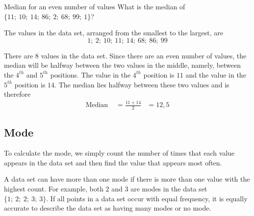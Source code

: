 \begin{wex}{Median for an even number of values}{
  What is the median of $\{11;\ 10;\ 14;\ 86;\ 2;\ 68;\ 99;\ 1\}$?
}{

  The values in the data set, arranged from the smallest to the largest, are
  \begin{equation*}
    1;\ 2;\ 10;\ 11;\ 14;\ 68;\ 86;\ 99
  \end{equation*}


  There are $8$ values in the data set. Since there are an even number
  of values, the median will be halfway between the two values in the
  middle, namely, between the $4^{th}$ and $5^{th}$ positions. The value in the
  $4^{th}$ position is $11$ and the value in the $5^{th}$ position is
  $14$. The median lies halfway between these two values and is
  therefore
  \begin{align*}
    \mbox{Median } &=\frac{11+14}{2} 
&= 12,5
  \end{align*}
}
\end{wex}

\subsection{Mode}

To calculate the mode, we simply count the number of times that each
value appears in the data set and then find the value that appears
most often.

A data set can have more than one mode if there is more than one value
with the highest count. For example, both $2$ and $3$ are modes in the
data set $\{1;\ 2;\ 2;\ 3;\ 3\}$. If all points in a data set occur
with equal frequency, it is equally accurate to describe the data set
as having many modes or no mode.

